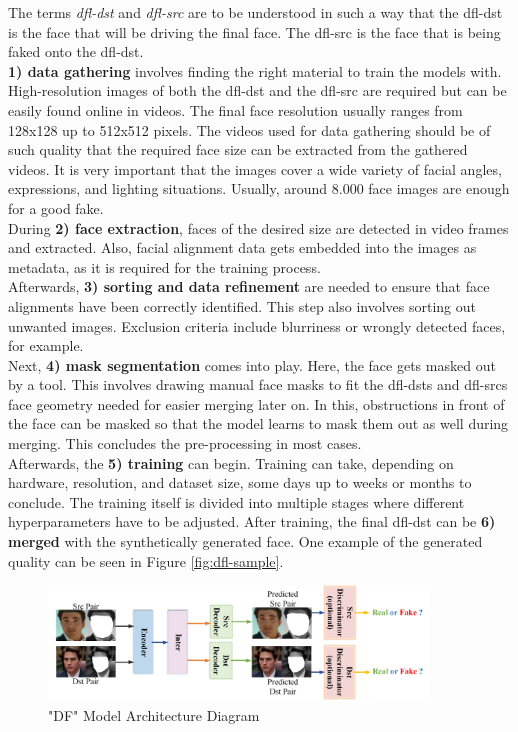 \documentclass[
  a4paper,  %
  twoside,  %
  bibliography=totoc,
  headsepline,
  cleardoublepage=empty,
  parskip=half,
  draft=false
]{scrbook}
\begin{document}
The terms \textit{\gls{dfl-dst}} and \textit{\gls{dfl-src}} are to be understood in such a way that the \gls{dfl-dst} is the face that will be driving the final face. The \gls{dfl-src} is the face that is being faked onto the \gls{dfl-dst}. \\
\textbf{1) data gathering} involves finding the right material to train the models with. High-resolution images of both the \gls{dfl-dst} and the \gls{dfl-src} are required but can be easily found online in videos. The final face resolution usually ranges from 128x128 up to 512x512 pixels. The videos used for data gathering should be of such quality that the required face size can be extracted from the gathered videos. It is very important that the images cover a wide variety of facial angles, expressions, and lighting situations. Usually, around 8.000 face images are enough for a good fake. \\
During \textbf{2) face extraction}, faces of the desired size are detected in video frames and extracted. Also, facial alignment data gets embedded into the images as metadata, as it is required for the training process. \\
Afterwards, \textbf{3) sorting and data refinement} are needed to ensure that face alignments have been correctly identified. This step also involves sorting out unwanted images. Exclusion criteria include blurriness or wrongly detected faces, for example. \\
Next, \textbf{4) mask segmentation} comes into play. Here, the face gets masked out by a tool. This involves drawing manual face masks to fit the \gls{dfl-dst}s and \gls{dfl-src}s face geometry needed for easier merging later on. In this, obstructions in front of the face can be masked so that the model learns to mask them out as well during merging.  This concludes the pre-processing in most cases.\\
Afterwards, the \textbf{5) training} can begin. Training can take, depending on hardware, resolution, and dataset size, some days up to weeks or months to conclude. The training itself is divided into multiple stages where different hyperparameters have to be adjusted. After training, the final \gls{dfl-dst} can be \textbf{6) merged} with the synthetically generated face. One example of the generated quality can be seen in Figure \ref{fig:dfl-sample}.

\begin{figure}[h]
  \centering
  \includegraphics[width=0.9\textwidth]{./graphics/df-model-arch.png}
  \caption{"DF" Model Architecture Diagram \cite{perovDeepFaceLabIntegratedFlexible2021}}
  \label{fig:df-model-diagram}
\end{figure}
\end{document}
